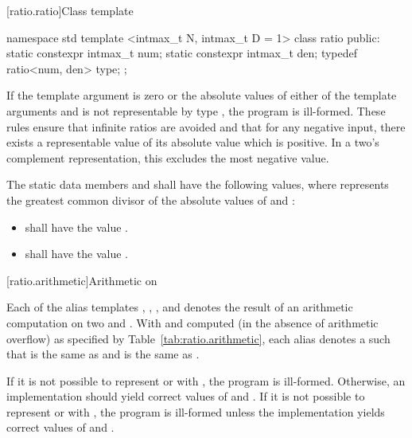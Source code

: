 [ratio.ratio]{Class template }

\begin{codeblock}
namespace std {
  template <intmax_t N, intmax_t D = 1>
  class ratio {
  public:
    static constexpr intmax_t num;
    static constexpr intmax_t den;
    typedef ratio<num, den> type;
  };
}
\end{codeblock}

\pnum
If the template argument  is zero or the absolute values of either of the
template arguments  and  is not representable by type
, the program is ill-formed. \enternote These rules ensure that infinite
ratios are avoided and that for any negative input, there exists a representable value
of its absolute value which is positive. In a two's complement representation, this
excludes the most negative value. \exitnote

\pnum
The static data members  and  shall have the following values,
where  represents the greatest common divisor of the absolute values of
 and :

\begin{itemize}
\item {} shall have the value .
\item {} shall have the value .
\end{itemize}

[ratio.arithmetic]{Arithmetic on }

\pnum
Each of the alias templates , , ,
and  denotes the result of an arithmetic computation on two
  and . With  and  computed (in the
absence of arithmetic overflow) as specified by Table~\ref{tab:ratio.arithmetic}, each alias
denotes a  such that  is the same as  and
 is the same as .

\pnum
If it is not possible to represent  or  with , the program is
ill-formed. Otherwise, an implementation should yield correct values of  and
. If it is not possible to represent  or  with , the
program is ill-formed unless the implementation yields correct values of  and
.

